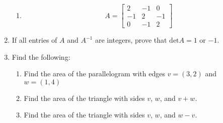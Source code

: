 \begin{enumerate}
\begin{enumerate}[label=\alph*.]
            \item 
                \begin{equation}
                    A =
                    \begin{bmatrix}
                        2 & -1 & 0 \\
                        -1 & 2 & -1 \\
                        0 & -1 & 2
                    \end{bmatrix}
                \end{equation}
        \end{enumerate}
        
    \item If all entries of $A$ and $A^{-1}$ are integers, prove that
        $\text{det}A=1$ or $-1$.

    \item Find the following:
        \begin{enumerate}[label=\alph*.]
            \item Find the area of the parallelogram with edges $v=(3,2)$
                and $w=(1,4)$
            \item Find the area of the triangle with sides $v$, $w$, and
                $v+w$. 
            \item Find the area of the triangle with sides $v$, $w$, and $w-v$.
        \end{enumerate}
\end{enumerate}
